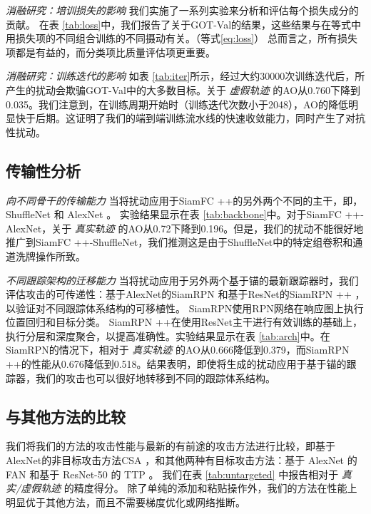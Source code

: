 \textit{消融研究：培训损失的影响} 我们实施了一系列实验来分析和评估每个损失成分的贡献。
在表 \ref{tab:loss}中，我们报告了关于GOT-Val的结果，这些结果与在等式中用损失项的不同组合训练的不同摄动有关。（等式\ref{eq:loss}）
总而言之，所有损失项都是有益的，而分类项比质量评估项更重要。

\textit{消融研究：训练迭代的影响} 如表 \ref{tab:iter}所示，经过大约30000次训练迭代后，所产生的扰动会欺骗GOT-Val中的大多数目标。关于 \textit{虚假轨迹} 的AO从0.760下降到0.035。我们注意到，在训练周期开始时（训练迭代次数小于2048），AO的降低明显快于后期。这证明了我们的端到端训练流水线的快速收敛能力，同时产生了对抗性扰动。

\subsection{传输性分析}

\textit{向不同骨干的传输能力} 当将扰动应用于SiamFC ++的另外两个不同的主干，即，ShuffleNet \cite{ShuffleNet} 和 AlexNet \cite{AlexNet}。
实验结果显示在表 \ref{tab:backbone}中。对于SiamFC ++-AlexNet，关于 \textit{真实轨迹} 的AO从0.72下降到0.196。但是，我们的扰动不能很好地推广到SiamFC ++-ShuffleNet，我们推测这是由于ShuffleNet中的特定组卷积和通道洗牌操作所致。

\textit{不同跟踪架构的迁移能力} 当将扰动应用于另外两个基于锚的最新跟踪器时，我们评估攻击的可传递性：基于AlexNet的SiamRPN \cite{SiamRPN} 和基于ResNet的SiamRPN ++ \cite{SiamRPN++} ，以验证对不同跟踪体系结构的可移植性。
SiamRPN使用RPN网络在响应图上执行位置回归和目标分类。 SiamRPN ++在使用ResNet主干进行有效训练的基础上，执行分层和深度聚合，以提高准确性。实验结果显示在表 \ref{tab:arch}中。在SiamRPN的情况下，相对于 \textit{真实轨迹} 的AO从0.666降低到0.379，而SiamRPN ++的性能从0.676降低到0.518。结果表明，即使将生成的扰动应用于基于锚的跟踪器，我们的攻击也可以很好地转移到不同的跟踪体系结构。

\subsection{与其他方法的比较}

我们将我们的方法的攻击性能与最新的有前途的攻击方法进行比较，即基于AlexNet的非目标攻击方法CSA \cite{CSA}，和其他两种有目标攻击方法：基于 AlexNet 的 FAN \cite{FAN} 和基于 ResNet-50 的 TTP \cite{TTP}。
我们在表 \ref{tab:untargeted} 中报告相对于 \textit{真实/虚假轨迹} 的精度得分。
除了单纯的添加和粘贴操作外，我们的方法在性能上明显优于其他方法，而且不需要梯度优化或网络推断。

